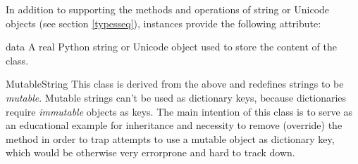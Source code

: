 In addition to supporting the methods and operations of string  or
Unicode objects (see section \ref{typesseq}),  instances
provide the following attribute:

\begin{memberdesc}{data}
A real Python string or Unicode object used to store the content of the
 class.
\end{memberdesc}

\begin{classdesc}{MutableString}{}
This class is derived from the  above and redefines
strings to be \emph{mutable}.  Mutable strings can't be used as
dictionary keys, because dictionaries require \emph{immutable} objects as
keys.  The main intention of this class is to serve as an educational
example for inheritance and necessity to remove (override) the
 method in order to trap attempts to use a
mutable object as dictionary key, which would be otherwise very
errorprone and hard to track down.
\end{classdesc}
